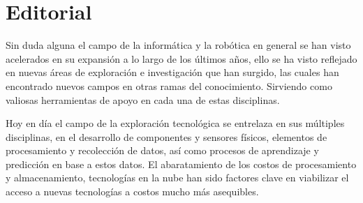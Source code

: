 \documentclass[12pt,spanish,Letterpaper,openany]{book}
\makeatletter
\renewcommand\frontmatter{\clearpage\@mainmatterfalse\pagenumbering{roman}}
\newcommand{\spaceinitialeditorialcontenido}{\vspace{-10.1mm}}
\newcommand{\labelchapter}{\empty}
\newcommand{\noformatchapter}{\normalfont\bfseries}
\newcommand{\nolabelchapter}{\labelchapter}
\newcommand{\nosepchapter}{0pt}
\newcommand{\nobeforecodechapter}{\Huge}
\makeatother
\begin{document}
{{{      {%
        {}%
        {}%
      }%
		}%
		{%
      {}%
      {%
        {}%
        {}%
      }%
		}%
}{}%
%
%
\BgMaterial}


\frontmatter

\titleformat{\chapter}[display]{\noformatchapter}{\nolabelchapter}{\nosepchapter}{\nobeforecodechapter}

\hypertarget{editorial}{%
\chapter*{Editorial}\label{editorial}}

\spaceinitialeditorialcontenido

Sin duda alguna el campo de la informática y la robótica en general se han visto acelerados en su expansión a lo largo de los últimos años, ello se ha visto reflejado en nuevas áreas de exploración e investigación que han surgido, las cuales han encontrado nuevos campos en otras ramas del conocimiento. Sirviendo como valiosas herramientas de apoyo en cada una de estas disciplinas.

Hoy en día el campo de la exploración tecnológica se entrelaza en sus múltiples disciplinas, en el desarrollo de componentes y sensores físicos, elementos de procesamiento y recolección de datos, así como procesos de aprendizaje y predicción en base a estos datos. El abaratamiento de los costos de procesamiento y almacenamiento, tecnologías en la nube han sido factores clave en viabilizar el acceso a nuevas tecnologías a costos mucho más asequibles.
\end{document}
